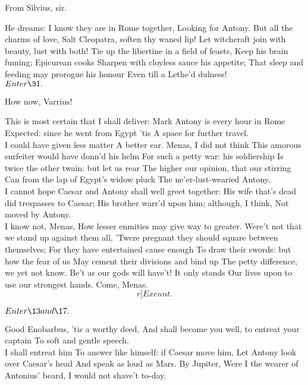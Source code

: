 \documentclass{book}
\begin{document}
	From Silvius, sir.

	He dreams: I know they are in Rome together,
	Looking for Antony. But all the charms of love,
	Salt Cleopatra, soften thy waned lip!
	Let witchcraft join with beauty, lust with both!
	Tie up the libertine in a field of feasts,
	Keep his brain fuming; Epicurean cooks
	Sharpen with cloyless sauce his appetite;
	That sleep and feeding may prorogue his honour
	Even till a Lethe'd dulness! \\

	\(Enter \31.\)

		       How now, Varrius!

	This is most certain that I shall deliver:
	Mark Antony is every hour in Rome
	Expected: since he went from Egypt 'tis
	A space for further travel. \\

	I could have given less matter
	A better ear. Menas, I did not think
	This amorous surfeiter would have donn'd his helm
	For such a petty war: his soldiership
	Is twice the other twain: but let us rear
	The higher our opinion, that our stirring
	Can from the lap of Egypt's widow pluck
	The ne'er-lust-wearied Antony. \\

	I cannot hope
	Caesar and Antony shall well greet together:
	His wife that's dead did trespasses to Caesar;
	His brother warr'd upon him; although, I think,
	Not moved by Antony. \\

	I know not, Menas,
	How lesser enmities may give way to greater.
	Were't not that we stand up against them all,
	'Twere pregnant they should square between themselves;
	For they have entertained cause enough
	To draw their swords: but how the fear of us
	May cement their divisions and bind up
	The petty difference, we yet not know.
	Be't as our gods will have't! It only stands
	Our lives upon to use our strongest hands.
	Come, Menas.  	\[r]Exeunt.\]




	\(Enter \13 and \17.\)

	Good Enobarbus, 'tis a worthy deed,
	And shall become you well, to entreat your captain
	To soft and gentle speech. \\

	I shall entreat him
	To answer like himself: if Caesar move him,
	Let Antony look over Caesar's head
	And speak as loud as Mars. By Jupiter,
	Were I the wearer of Antonius' beard,
	I would not shave't to-day.  \\
\end{document}
